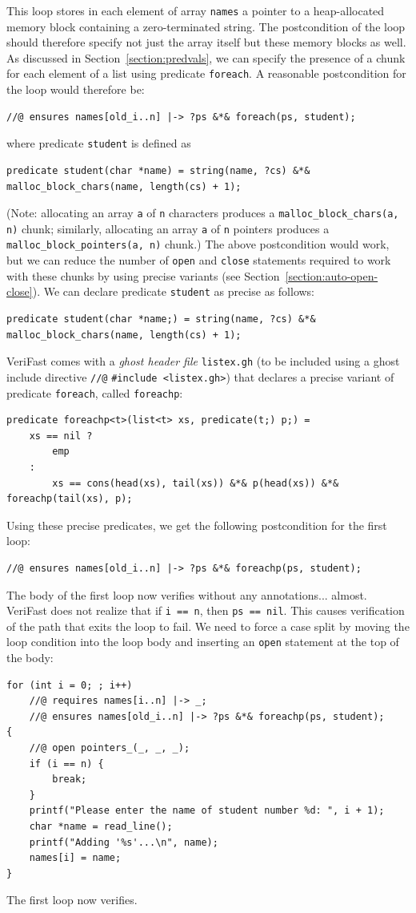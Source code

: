 \documentclass{article}
\begin{document}
This loop stores in each element of array \lstinline!names! a
pointer to a heap-allocated memory block containing a
zero-terminated string. The postcondition of the loop should
therefore specify not just the array itself but these memory
blocks as well. As discussed in Section~\ref{section:predvals},
we can specify the presence of a chunk for each element of a
list using predicate \lstinline!foreach!. A reasonable
postcondition for the loop would therefore be:
\begin{lstlisting}
//@ ensures names[old_i..n] |-> ?ps &*& foreach(ps, student);
\end{lstlisting}
where predicate \lstinline!student! is defined as
\begin{lstlisting}
predicate student(char *name) = string(name, ?cs) &*& malloc_block_chars(name, length(cs) + 1);
\end{lstlisting}
(Note: allocating an array \lstinline!a! of \lstinline!n!
characters produces a \lstinline!malloc_block_chars(a, n)!
chunk; similarly, allocating an array \lstinline!a! of
\lstinline!n! pointers produces a
\lstinline!malloc_block_pointers(a, n)! chunk.) The above
postcondition would work, but we can reduce the number of
\lstinline!open! and \lstinline!close! statements required to
work with these chunks by using precise variants (see
Section~\ref{section:auto-open-close}). We can declare
predicate \lstinline!student! as precise as follows:
\begin{lstlisting}
predicate student(char *name;) = string(name, ?cs) &*& malloc_block_chars(name, length(cs) + 1);
\end{lstlisting}
VeriFast comes with a \emph{ghost header file}
\lstinline!listex.gh! (to be included using a ghost include
directive \lstinline!//@! \lstinline!#include <listex.gh>!)
that declares a precise variant of predicate
\lstinline!foreach!, called \lstinline!foreachp!:
\begin{lstlisting}
predicate foreachp<t>(list<t> xs, predicate(t;) p;) =
    xs == nil ?
        emp
    :
        xs == cons(head(xs), tail(xs)) &*& p(head(xs)) &*& foreachp(tail(xs), p);
\end{lstlisting}
Using these precise predicates, we get the following
postcondition for the first loop:
\begin{lstlisting}
//@ ensures names[old_i..n] |-> ?ps &*& foreachp(ps, student);
\end{lstlisting}
The body of the first loop now verifies without any
annotations... almost. VeriFast does not realize that if
\lstinline!i == n!, then \lstinline!ps == nil!. This causes
verification of the path that exits the loop to fail. We need
to force a case split by moving the loop condition into the
loop body and inserting an \lstinline!open! statement at the
top of the body:
\begin{lstlisting}
for (int i = 0; ; i++)
    //@ requires names[i..n] |-> _;
    //@ ensures names[old_i..n] |-> ?ps &*& foreachp(ps, student);
{
    //@ open pointers_(_, _, _);
    if (i == n) {
        break;
    }
    printf("Please enter the name of student number %d: ", i + 1);
    char *name = read_line();
    printf("Adding '%s'...\n", name);
    names[i] = name;
}
\end{lstlisting}
The first loop now verifies.
\end{document}
